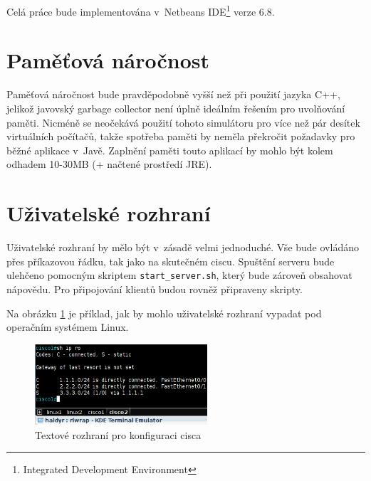 Celá práce bude implementována v~Netbeans IDE\footnote{Integrated Development Environment} verze 6.8.


\section{Paměťová náročnost}
Paměťová náročnost bude pravděpodobně vyšší než při použití jazyka C++, jelikož javovský garbage collector není úplně ideálním řešením pro uvolňování paměti. Nicméně se neočekává použití tohoto simulátoru pro více než pár desítek virtuálních počítačů, takže spotřeba paměti by neměla překročit požadavky pro běžné aplikace v~Javě. Zaplnění paměti touto aplikací by mohlo být kolem odhadem 10-30MB (+ načtené prostředí JRE).


\section{Uživatelské rozhraní}
Uživatelské rozhraní by mělo být v~zásadě velmi jednoduché. Vše bude ovládáno přes příkazovou řádku, tak jako na skutečném ciscu. Spuštění serveru bude ulehčeno pomocným skriptem \verb|start_server.sh|, který bude zároveň obsahovat nápovědu. Pro připojování klientů budou rovněž připraveny skripty. 

Na obrázku \ref{fig:uziv_rozh} je příklad, jak by mohlo uživatelské rozhraní vypadat pod operačním systémem Linux.

\begin{figure}[h]
\begin{center}
\includegraphics[height=3cm]{figures/uziv_rozhrani}
\caption{Textové rozhraní pro konfiguraci cisca}
\label{fig:uziv_rozh}
\end{center}
\end{figure}









